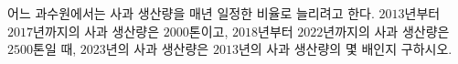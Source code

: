 어느 과수원에서는 사과 생산량을 매년 일정한 비율로 늘리려고 한다. $2013$년부터 $2017$년까지의 사과 생산량은 $2000$톤이고, $2018$년부터 $2022$년까지의 사과 생산량은 $2500$톤일 때, $2023$년의 사과 생산량은 $2013$년의 사과 생산량의 몇 배인지 구하시오.

